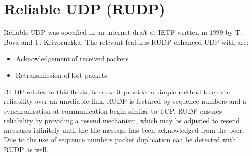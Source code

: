 \section{Reliable UDP (RUDP)}
Reliable UDP was specified in an internet draft at IETF written in 1999 by
T. Bova and T. Krivoruchka.\cite{rudp}
The relevant features RUDP enhanced UDP\cite{rfc768} with
are:
\begin{itemize}
\item Acknowledgement of received packets
\item Retransmission of lost packets
\end{itemize}
RUDP relates to this thesis, because it provides a simple method
to create reliability over an unreliable link. RUDP is
featured by sequence numbers and a synchronisation at communication
begin similar to TCP.\cite{rfc793}
RUDP ensures reliability by providing a resend mechanism, which may
be adjusted to resend messages infinitely until the the message has
been acknowledged from the peer.
Due to the use of sequence numbers packet duplication can be detected
with RUDP as well.
